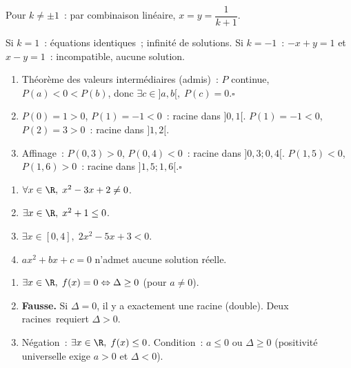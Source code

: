 Pour $k\ne\pm1$~: par combinaison lin\'eaire, $x=y=\dfrac{1}{k+1}$.

Si $k=1$~: \'equations identiques~; infinit\'e de solutions.
Si $k=-1$~: $-x+y=1$ et $x-y=1$~: incompatible, aucune solution.


\begin{enumerate}
  \item Th\'eor\`eme des valeurs interm\'ediaires (admis)~: $P$ continue,
        $P(a)<0<P(b)$, donc $\exists c\in]a,b[,\;P(c)=0$.\hfill$\square$
  \item $P(0)=1>0$, $P(1)=-1<0$~: racine dans $]0,1[$.\checkmark\quad
        $P(1)=-1<0$, $P(2)=3>0$~: racine dans $]1,2[$.\checkmark
  \item Affinage~: $P(0{,}3)>0$, $P(0{,}4)<0$~: racine dans $]0{,}3;0{,}4[$.
        $P(1{,}5)<0$, $P(1{,}6)>0$~: racine dans $]1{,}5;1{,}6[$.\hfill$\square$
\end{enumerate}


\begin{enumerate}
  \item $\forall x\in\R,\;x^2-3x+2\ne0$.
  \item $\exists x\in\R,\;x^2+1\leq0$.
  \item $\exists x\in[0,4],\;2x^2-5x+3<0$.
  \item \og $ax^2+bx+c=0$ n'admet aucune solution r\'eelle.\fg
\end{enumerate}


\begin{enumerate}
  \item $\exists x\in\R,\;f(x)=0\Leftrightarrow\Delta\geq0$ (pour $a\ne0$).
  \item \textbf{Fausse.} Si $\Delta=0$, il y a exactement une racine (double).
        \og Deux racines\fg\ requiert $\Delta>0$.
  \item N\'egation~: $\exists x\in\R,\;f(x)\leq0$.
        Condition~: $a\leq0$ ou $\Delta\geq0$
        (positivit\'e universelle exige $a>0$ et $\Delta<0$).
\end{enumerate}

